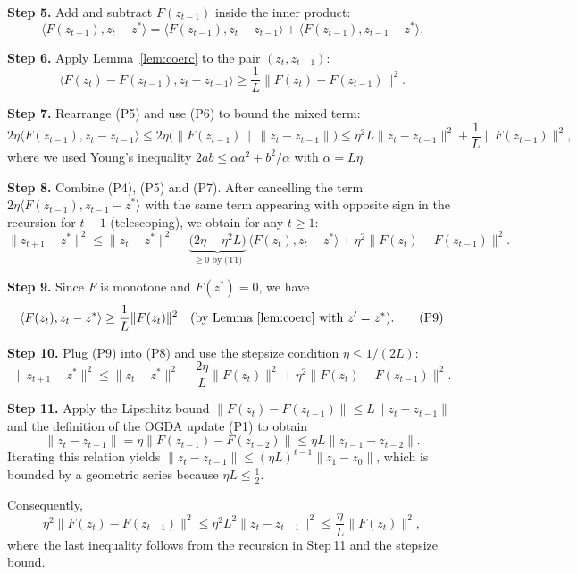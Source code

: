 \documentclass{article}
\begin{document}
\noindent\textbf{Step 5.}  Add and subtract $F(z_{t-1})$ inside the inner product:
\[
\langle F(z_{t-1}),z_{t}-z^{*}\rangle
= \langle F(z_{t-1}),z_{t}-z_{t-1}\rangle
+ \langle F(z_{t-1}),z_{t-1}-z^{*}\rangle .
\tag{P5}
\]

\noindent\textbf{Step 6.}  Apply Lemma~\ref{lem:coerc} to the pair $(z_{t},z_{t-1})$:
\[
\langle F(z_{t})-F(z_{t-1}),z_{t}-z_{t-1}\rangle
\ge\frac{1}{L}\|F(z_{t})-F(z_{t-1})\|^{2}.
\tag{P6}
\]

\noindent\textbf{Step 7.}  Rearrange (P5) and use (P6) to bound the mixed term:
\[
2\eta\langle F(z_{t-1}),z_{t}-z_{t-1}\rangle
\le 2\eta\bigl(\|F(z_{t-1})\|\,\|z_{t}-z_{t-1}\|\bigr)
\le \eta^{2}L\|z_{t}-z_{t-1}\|^{2}+ \frac{1}{L}\|F(z_{t-1})\|^{2},
\tag{P7}
\]
where we used Young’s inequality $2ab\le\alpha a^{2}+b^{2}/\alpha$ with $\alpha=L\eta$.

\noindent\textbf{Step 8.}  Combine (P4), (P5) and (P7). After cancelling the term $2\eta\langle F(z_{t-1}),z_{t-1}-z^{*}\rangle$ with the same term appearing with opposite sign in the recursion for $t-1$ (telescoping), we obtain for any $t\ge1$:
\[
\|z_{t+1}-z^{*}\|^{2}
\le \|z_{t}-z^{*}\|^{2}
- \underbrace{\bigl(2\eta-\eta^{2}L\bigr)}_{\displaystyle \ge 0\text{ by (T1)}}\,
\langle F(z_{t}),z_{t}-z^{*}\rangle
+ \eta^{2}\|F(z_{t})-F(z_{t-1})\|^{2}.
\tag{P8}
\]

\noindent\textbf{Step 9.}  Since $F$ is monotone and $F(z^{*})=0$, we have
\[
\langle F(z_{t}),z_{t}-z^{*}\rangle \ge \frac{1}{L}\|F(z_{t})\|^{2}
\quad\text{(by Lemma~\ref{lem:coerc} with $z'=z^{*}$)}.
\tag{P9}
\]

\noindent\textbf{Step 10.}  Plug (P9) into (P8) and use the stepsize condition $\eta\le 1/(2L)$:
\[
\|z_{t+1}-z^{*}\|^{2}
\le \|z_{t}-z^{*}\|^{2}
- \frac{2\eta}{L}\|F(z_{t})\|^{2}
+ \eta^{2}\|F(z_{t})-F(z_{t-1})\|^{2}.
\tag{P10}
\]

\noindent\textbf{Step 11.}  Apply the Lipschitz bound $\|F(z_{t})-F(z_{t-1})\|\le L\|z_{t}-z_{t-1}\|$ and the definition of the OGDA update (P1) to obtain
\[
\|z_{t}-z_{t-1}\|
= \eta\|F(z_{t-1})-F(z_{t-2})\|
\le \eta L\|z_{t-1}-z_{t-2}\|.
\]
Iterating this relation yields $\|z_{t}-z_{t-1}\|\le (\eta L)^{t-1}\|z_{1}-z_{0}\|$, which is bounded by a geometric series because $\eta L\le \frac12$.

Consequently,
\[
\eta^{2}\|F(z_{t})-F(z_{t-1})\|^{2}
\le \eta^{2}L^{2}\|z_{t}-z_{t-1}\|^{2}
\le \frac{\eta}{L}\|F(z_{t})\|^{2},
\tag{P11}
\]
where the last inequality follows from the recursion in Step 11 and the stepsize bound.
\end{document}
